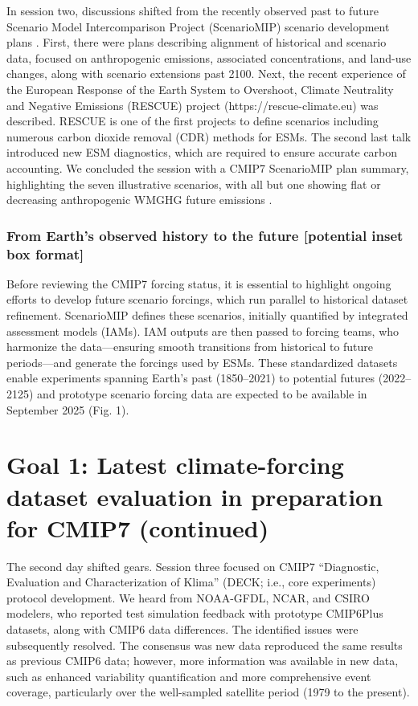 \documentclass{ametsocV6.1}
\begin{document}
In session two, discussions shifted from the recently observed past to future Scenario Model Intercomparison Project (ScenarioMIP) scenario development plans \citep{van_vuuren_scenario_2025}. First, there were plans describing alignment of historical and scenario data, focused on anthropogenic emissions, associated concentrations, and land-use changes, along with scenario extensions past 2100. Next, the recent experience of the European Response of the Earth System to Overshoot, Climate Neutrality and Negative Emissions (RESCUE) project (https://rescue-climate.eu) was described. RESCUE is one of the first projects to define scenarios including numerous carbon dioxide removal (CDR) methods for ESMs. The second last talk introduced new ESM diagnostics, which are required to ensure accurate carbon accounting. We concluded the session with a CMIP7 ScenarioMIP plan summary, highlighting the seven illustrative scenarios, with all but one showing flat or decreasing anthropogenic WMGHG future emissions \citep{van_vuuren_scenario_2025}.

\subsubsection*{From Earth’s observed history to the future [potential inset box format]}
Before reviewing the CMIP7 forcing status, it is essential to highlight ongoing efforts to develop future scenario forcings, which run parallel to historical dataset refinement. ScenarioMIP \citep{van_vuuren_scenario_2025} defines these scenarios, initially quantified by integrated assessment models (IAMs). IAM outputs are then passed to forcing teams, who harmonize the data—ensuring smooth transitions from historical to future periods—and generate the forcings used by ESMs. These standardized datasets enable experiments spanning Earth’s past (1850–2021) to potential futures (2022–2125) and prototype scenario forcing data are expected to be available in September 2025 (Fig. 1).

\section*{Goal 1: Latest climate-forcing dataset evaluation in preparation for CMIP7 (continued)}
The second day shifted gears. Session three focused on CMIP7 ``Diagnostic, Evaluation and Characterization of Klima'' (DECK; i.e., core experiments) protocol development. We heard from NOAA-GFDL, NCAR, and CSIRO modelers, who reported test simulation feedback with prototype CMIP6Plus datasets, along with CMIP6 data differences. The identified issues were subsequently resolved. The consensus was new data reproduced the same results as previous CMIP6 data; however, more information was available in new data, such as enhanced variability quantification and more comprehensive event coverage, particularly over the well-sampled satellite period (1979 to the present).
\end{document}
